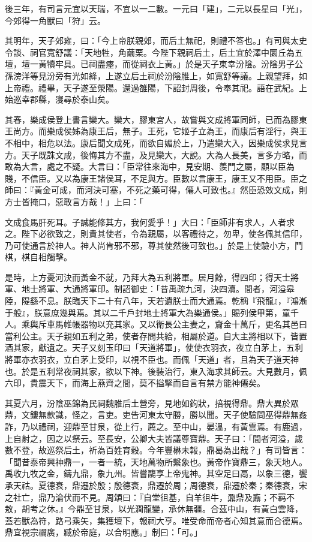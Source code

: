 \begin{pinyinscope}
後三年，有司言元宜以天瑞，不宜以一二數。一元曰「建」，二元以長星曰「光」，今郊得一角獸曰「狩」云。

其明年，天子郊雍，曰：「今上帝朕親郊，而后土無祀，則禮不答也。」有司與太史令談、祠官寬舒議：「天地牲，角繭栗。今陛下親祠后土，后土宜於澤中圜丘為五壇，壇一黃犢牢具。已祠盡瘞，而從祠衣上黃。」於是天子東幸汾陰。汾陰男子公孫滂洋等見汾旁有光如絳，上遂立后土祠於汾陰脽上，如寬舒等議。上親望拜，如上帝禮。禮畢，天子遂至滎陽。還過雒陽，下詔封周後，令奉其祀。語在武紀。上始巡幸郡縣，寖尋於泰山矣。

其春，樂成侯登上書言欒大。欒大，膠東宮人，故嘗與文成將軍同師，已而為膠東王尚方。而樂成侯姊為康王后，無子。王死，它姬子立為王，而康后有淫行，與王不相中，相危以法。康后聞文成死，而欲自媚於上，乃遣欒大入，因樂成侯求見言方。天子既誅文成，後悔其方不盡，及見欒大，大說。大為人長美，言多方略，而敢為大言，處之不疑。大言曰：「臣常往來海中，見安期、羨門之屬，顧以臣為賤，不信臣。又以為康王諸侯耳，不足與方。臣數以言康王，康王又不用臣。臣之師曰：『黃金可成，而河決可塞，不死之藥可得，僊人可致也。』然臣恐效文成，則方士皆掩口，惡敢言方哉！」上曰：「

文成食馬肝死耳。子誠能修其方，我何愛乎！」大曰：「臣師非有求人，人者求之。陛下必欲致之，則貴其使者，令為親屬，以客禮待之，勿卑，使各佩其信印，乃可使通言於神人。神人尚肯邪不邪，尊其使然後可致也。」於是上使驗小方，鬥棋，棋自相觸擊。

是時，上方憂河決而黃金不就，乃拜大為五利將軍。居月餘，得四印；得天士將軍、地士將軍、大通將軍印。制詔御史：「昔禹疏九河，決四瀆。間者，河溢皋陸，隄繇不息。朕臨天下二十有八年，天若遺朕士而大通焉。乾稱『飛龍』，『鴻漸于般』，朕意庶幾與焉。其以二千戶封地士將軍大為樂通侯。」賜列侯甲第，童千人。乘輿斥車馬帷帳器物以充其家。又以衛長公主妻之，齎金十萬斤，更名其邑曰當利公主。天子親如五利之弟，使者存問共給，相屬於道。自大主將相以下，皆置酒其家，獻遺之。天子又刻玉印曰「天道將軍」，使使衣羽衣，夜立白茅上，五利將軍亦衣羽衣，立白茅上受印，以視不臣也。而佩「天道」者，且為天子道天神也。於是五利常夜祠其家，欲以下神。後裝治行，東入海求其師云。大見數月，佩六印，貴震天下，而海上燕齊之間，莫不搤掔而自言有禁方能神僊矣。

其夏六月，汾陰巫錦為民祠魏脽后土營旁，見地如鉤狀，掊視得鼎。鼎大異於眾鼎，文鏤無款識，怪之，言吏。吏告河東太守勝，勝以聞。天子使驗問巫得鼎無姦詐，乃以禮祠，迎鼎至甘泉，從上行，薦之。至中山，晏溫，有黃雲焉。有鹿過，上自射之，因之以祭云。至長安，公卿大夫皆議尊寶鼎。天子曰：「間者河溢，歲數不登，故巡祭后土，祈為百姓育穀。今年豐楙未報，鼎曷為出哉？」有司皆言：「聞昔泰帝興神鼎一，一者一統，天地萬物所繫象也。黃帝作寶鼎三，象天地人。禹收九牧之金，鑄九鼎，象九州。皆嘗鬺享上帝鬼神。其空足曰鬲，以象三德，饗承天祜。夏德衰，鼎遷於殷；殷德衰，鼎遷於周；周德衰，鼎遷於秦；秦德衰，宋之社亡，鼎乃淪伏而不見。周頌曰：『自堂徂基，自羊徂牛，鼐鼎及鼒；不羁不敖，胡考之休。』今鼎至甘泉，以光潤龍變，承休無疆。合茲中山，有黃白雲降，蓋若獸為符，路弓乘矢，集獲壇下，報祠大亨。唯受命而帝者心知其意而合德焉。鼎宜視宗禰廣，臧於帝庭，以合明應。」制曰：「可。」


\end{pinyinscope}
